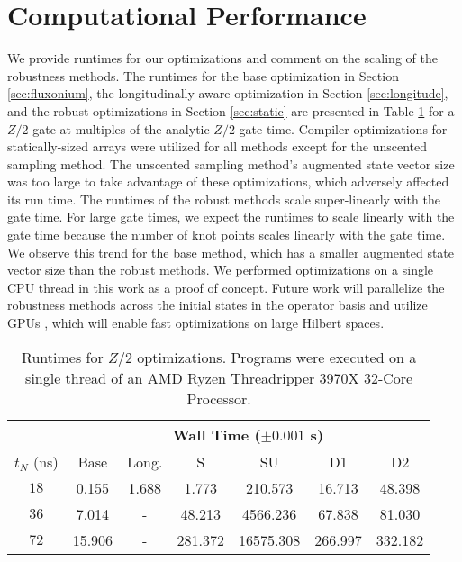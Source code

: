 \section{Computational Performance \label{appendix:time}}
We provide runtimes for our optimizations and comment on the scaling of the
robustness methods. The runtimes for
the base optimization in Section \ref{sec:fluxonium},
the longitudinally aware optimization in Section \ref{sec:longitude},
and the robust optimizations in Section \ref{sec:static}
are presented in Table \ref{tab:time}
for a $Z/2$ gate at multiples of the analytic $Z/2$ gate time.
Compiler optimizations for statically-sized arrays were utilized
for all methods except for the unscented sampling method.
The unscented sampling method's augmented state vector size
was too large to take advantage of these optimizations,
which adversely affected its run time.
The runtimes of the robust methods scale
super-linearly with the gate time.
For large gate times, we expect the runtimes
to scale linearly with the gate time
because the number of knot points scales linearly with the gate time.
We observe this trend for the base method, which has a smaller
augmented state vector size than the robust methods.
We performed optimizations on a single CPU thread in this work as a proof
of concept. Future work will parallelize the robustness
methods across the initial states in the operator basis and utilize GPUs
\cite{leung2017speedup},
which will enable fast optimizations on large Hilbert spaces.
\vspace*{\intextsep}
\begin{table}[H]
  \begin{tabular} {c | c | c | c | c | c | c}
    & \multicolumn{6}{c}{Wall Time ($\pm 0.001$ s)}\\
    \hline
    $t_{N}$ (ns) & Base & Long. & S & SU & D1 & D2\\
    \hline
    $18$ & 0.155 & 1.688 & 1.773 & 210.573 & 16.713 & 48.398\\ %
    $36$ & 7.014 & - & 48.213 & 4566.236 & 67.838 & 81.030\\
    $72$ & 15.906 & - & 281.372 & 16575.308 & 266.997 & 332.182\\
  \end{tabular}
  \caption{
    Runtimes for $Z/2$ optimizations.
    Programs were executed on a single thread of an
    AMD Ryzen Threadripper 3970X 32-Core Processor.
  }
  \label{tab:time}
\end{table}

